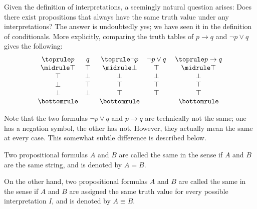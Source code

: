 Given the definition of interpretations,
a seemingly natural question arises:
Does there exist propositions that always have the same truth value
under any interpretations?
The answer is undoubtedly yes;
we have seen it in the definition of conditionals.
More explicitly,
comparing the truth tables of \(p\to q\) and \(\neg p\vee q\)
gives the following:
\[
    \begin{array}{c c}\toprule
        p & q \\ \midrule
        \top & \top \\
        \top & \bot \\
        \bot & \top \\
        \bot & \bot \\ \bottomrule
    \end{array}
    \;
    \begin{array}{c c}\toprule
        \neg p & \neg p\vee q \\ \midrule
        \bot & \top \\
        \bot & \bot \\
        \top & \top \\
        \top & \top \\ \bottomrule
    \end{array}
    \;
    \begin{array}{c} \toprule
        p\to q \\ \midrule
        \top \\
        \bot \\
        \top \\
        \top \\ \bottomrule
    \end{array}
\]

Note that
the two formulas \(\neg p\vee q\) and \(p\to q\)
are technically not the same;
one has a negation symbol, the other has not.
However, they actually mean the same at every case.
This somewhat subtle difference is described below.

\begin{definition}
    \label{def:synsem}
    Two propositional formulas \(A\) and \(B\)
    are called the same in the  sense
    if \(A\) and \(B\) are the same string,
    and is denoted by \(A=B\).

    On the other hand,
    two propositional formulas \(A\) and \(B\)
    are called the same in the  sense
    if \(A\) and \(B\) are assigned the same truth value
    for every possible interpretation \(I\),
    and is denoted by \(A\equiv B\).
\end{definition}

